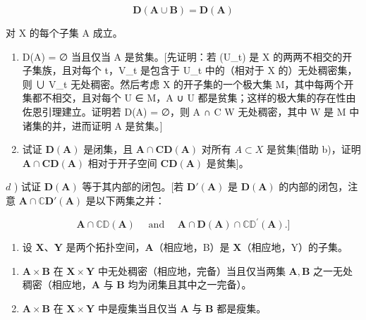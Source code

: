 \[
\mathbf {D} (\mathbf {A} \cup \mathbf {B}) = \mathbf {D} (\mathbf {A})
\]

对 X 的每个子集 A 成立。

\begin{enumerate}
\def\labelenumi{\alph{enumi})}
\setcounter{enumi}{1}
\item
  D(A) = ∅ 当且仅当 A 是贫集。{[}先证明：若 (U\_t) 是 X 的两两不相交的开子集族，且对每个 t，V\_t 是包含于 U\_t 中的（相对于 X 的）无处稠密集，则 ∪ V\_t 无处稠密。然后考虑 X 的开子集的一个极大集 M，其中每两个开集都不相交，且对每个 U ∈ M，A ∪ U 都是贫集；这样的极大集的存在性由佐恩引理建立。证明若 D(A) = ∅，则 A ∩ C W 无处稠密，其中 W 是 M 中诸集的并，进而证明 A 是贫集。{]}
\item
  试证 \(\mathbf{D}(\mathbf{A})\) 是闭集，且 \(\mathbf{A} \cap \mathbf{CD}(\mathbf{A})\) 对所有 \(A \subset X\) 是贫集{[}借助 b)，证明 \(\mathbf{A} \cap \mathbf{CD}(\mathbf{A})\) 相对于开子空间 \(\mathbf{CD}(\mathbf{A})\) 是贫集{]}。
\end{enumerate}

\(d\) ) 试证 \(\mathbf{D}(\mathbf{A})\) 等于其内部的闭包。{[}若 \(\mathbf{D}'(\mathbf{A})\) 是 \(\mathbf{D}(\mathbf{A})\) 的内部的闭包，注意 \(\mathbf{A} \cap \mathbb{C}\mathbf{D}'(\mathbf{A})\) 是以下两集之并：

\[
\mathbf {A} \cap \mathbb {C D} (\mathbf {A}) \quad \text { and } \quad \mathbf {A} \cap \mathbf {D} (\mathbf {A}) \cap \mathbb {C D} ^ {\prime} (\mathbf {A}). ]
\]

\begin{enumerate}
\def\labelenumi{\arabic{enumi})}
\setcounter{enumi}{3}
\tightlist
\item
  设 \(\mathbf{X}\)、\(\mathbf{Y}\) 是两个拓扑空间，\(\mathbf{A}\)（相应地，B）是 \(\mathbf{X}\)（相应地，Y）的子集。
\end{enumerate}

\begin{enumerate}
\def\labelenumi{\alph{enumi})}
\item
  \(\mathbf{A} \times \mathbf{B}\) 在 \(\mathbf{X} \times \mathbf{Y}\) 中无处稠密（相应地，完备）当且仅当两集 \(\mathbf{A}, \mathbf{B}\) 之一无处稠密（相应地，\(\mathbf{A}\) 与 \(\mathbf{B}\) 均为闭集且其中之一完备）。
\item
  \(\mathbf{A} \times \mathbf{B}\) 在 \(\mathbf{X} \times \mathbf{Y}\) 中是瘦集当且仅当 \(\mathbf{A}\) 与 \(\mathbf{B}\) 都是瘦集。
\end{enumerate}

